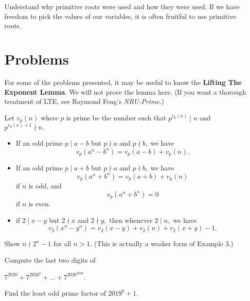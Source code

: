 \documentclass[mast]{lucky}
\begin{document}
Understand why primitive roots were used and how they were used. If we have freedom to pick the values of our variables, it is often fruitful to use primitive roots.

\pagebreak

\section{Problems}

For some of the problems presented, it may be useful to know the \textbf{Lifting The Exponent Lemma}. We will not prove the lemma here. (If you want a thorough treatment of LTE, see Raymond Feng's \emph{NRU-Prime}.)

\begin{theo}
Let $v_p(n)$ where $p$ is prime be the number such that $p^{v_p(n)} \mid n$ and $p ^{v_p(n)+1} \nmid n.$

\begin{itemize}
    \item If an odd prime $p \mid a-b$ but $p \nmid a$ and $p \nmid b,$ we have $$v_p(a^n - b^n) = v_p(a-b)+v_p(n).$$

    \item If an odd prime $p \mid a+b$ but $p \nmid a$ and $p \nmid b,$ we have $$v_p(a^n + b^n) = v_p(a+b)+v_p(n)$$ if $n$ is odd, and $$v_p(a^n + b^n) = 0$$ if $n$ is even.

    \item if $2 \mid x - y$ but $2 \nmid x$ and $2 \nmid y,$ then whenever $2 \mid n,$ we have $$v_2(x^n-y^n) = v_2(x-y)+v_2(n)+v_2(x+y)-1.$$
\end{itemize}
\end{theo}

\noindent{}


\begin{prob}[]{1}
Show $n \nmid 2^n-1$ for all $n>1.$ (This is actually a weaker form of Example 3.)
\end{prob}

\begin{prob}{1}
Compute the last two digits of

$7^{2020}+7^{2020^2}+\ldots +7^{2020^{2020}}$.
\end{prob}

\begin{prob}[AIME I 2019/14]{2}
Find the least odd prime factor of $2019^8+1$.
\end{prob}
\end{document}
